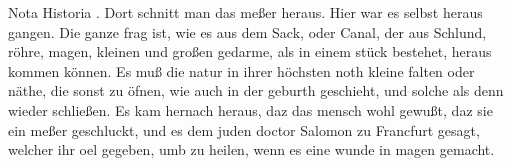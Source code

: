 Nota Historia .
Dort schnitt man das me{\ss}er heraus. Hier war es selbst heraus gangen. Die ganze frag ist, wie es aus dem Sack, oder Canal, der aus Schlund, r\"{o}hre, magen, kleinen und gro{\ss}en gedarme, als in einem st\"{u}ck bestehet, heraus kommen k\"{o}nnen. Es mu{\ss} die natur in ihrer h\"{o}chsten noth kleine falten oder n\"{a}the, die sonst zu \"{o}fnen, wie auch in der geburth geschieht, und solche als denn wieder schlie{\ss}en. Es kam hernach heraus, daz das mensch wohl gewu{\ss}t, daz sie ein me{\ss}er geschluckt, und es dem juden doctor Salomon\protect{} zu Francfurt\protect{} gesagt, welcher ihr oel gegeben, umb zu heilen, wenn es eine wunde in magen gemacht.%
\pend%
\count{}
\count{}
\count{}
